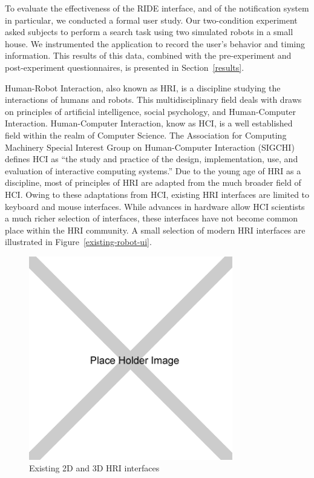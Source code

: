 To evaluate the effectiveness of the RIDE interface, and of the notification system in particular, we conducted a formal user study. Our two-condition experiment asked subjects to perform a search task using two simulated robots in a small house. We instrumented the application to record the user's behavior and timing information. This results of this data, combined with the pre-experiment and post-experiment questionnaires, is presented in Section~\ref{results}.

Human-Robot Interaction, also known as HRI, is a discipline studying the interactions of humans and robots. This multidisciplinary field deals with draws on principles of artificial intelligence, social psychology, and Human-Computer Interaction. Human-Computer Interaction, know as HCI, is a well established field within the realm of Computer Science. The Association for Computing Machinery Special Interest Group on Human-Computer Interaction (SIGCHI) defines HCI as ``the study and practice of the design, implementation, use, and evaluation of interactive computing systems.'' \cite{SIGCHI} Due to the young age of HRI as a discipline, most of principles of HRI are adapted from the much broader field of HCI. Owing to these adaptations from HCI, existing HRI interfaces are limited to keyboard and mouse interfaces. While advances in hardware allow HCI scientists a much richer selection of interfaces, these interfaces have not become common place within the HRI community. A small selection of modern HRI interfaces are illustrated in Figure~\ref{existing-robot-ui}.

\begin{figure}[ht]
\begin{center}
\includegraphics[width=3.5in]{images/placeholder.png}
\caption{Existing 2D and 3D HRI interfaces\label{fig:existing-robot-ui}}
\end{center}
\end{figure}

